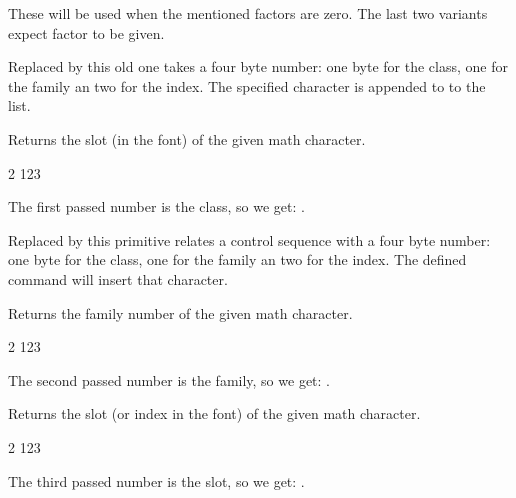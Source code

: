 These will be used when the mentioned factors are zero. The last two variants
expect factor to be given.

\stopnewprimitive

\startoldprimitive[title={\prm {mathchar}}][obsolete=yes]

Replaced by  this old one takes a four byte number: one byte for
the class, one for the family an two for the index. The specified character is
appended to to the list.

\stopoldprimitive

\startnewprimitive[title={\prm {mathcharclass}}]

Returns the slot (in the font) of the given math character.

\startbuffer
\the\mathcharclass{} 2 123
\stopbuffer

\typebuffer

The first passed number is the class, so we get: \inlinebuffer.

\stopnewprimitive

\startoldprimitive[title={\prm {mathchardef}}][obsolete=yes]

Replaced by  this primitive relates a control sequence with a
four byte number: one byte for the class, one for the family an two for the
index. The defined command will insert that character.

\stopoldprimitive

\startnewprimitive[title={\prm {mathcharfam}}]

Returns the family number of the given math character.

\startbuffer
\the\mathcharfam{} 2 123
\stopbuffer

\typebuffer

The second passed number is the family, so we get: \inlinebuffer.

\stopnewprimitive

\startnewprimitive[title={\prm {mathcharslot}}]

Returns the slot (or index in the font) of the given math character.

\startbuffer
\the\mathcharslot{} 2 123
\stopbuffer

\typebuffer

The third passed number is the slot, so we get: \inlinebuffer.

\stopnewprimitive

\startnewprimitive[title={\prm {mathcheckfencesmode}}]

